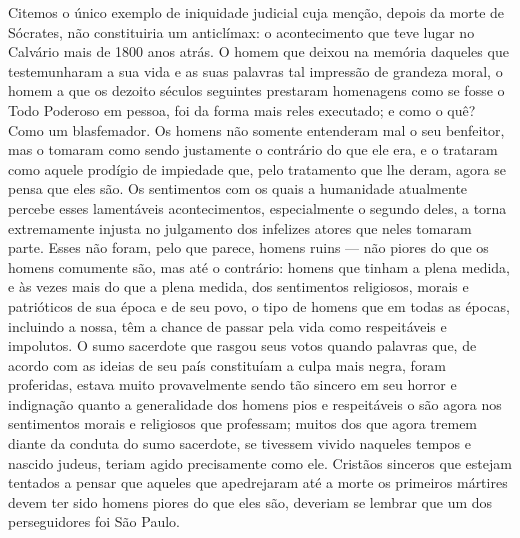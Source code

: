 Citemos o único exemplo de iniquidade judicial cuja menção, depois
da morte de Sócrates, não constituiria um anticlímax: o acontecimento que teve
lugar no Calvário mais de 1800 anos atrás. O homem que
deixou na memória daqueles que testemunharam a sua vida e as suas palavras
tal impressão de grandeza moral, o homem a  que os dezoito séculos 
seguintes prestaram homenagens como se fosse o Todo Poderoso em
pessoa, foi da forma mais reles executado; e como o quê? Como um
blasfemador. Os homens não somente entenderam mal o seu benfeitor, mas
o tomaram como sendo justamente o contrário do que ele era, e o
trataram como aquele prodígio de impiedade que, pelo tratamento que
lhe deram, agora se pensa que eles são. Os sentimentos com os quais a
humanidade atualmente percebe esses lamentáveis acontecimentos,
especialmente o segundo deles, a torna extremamente injusta no
julgamento dos infelizes atores que neles tomaram parte. Esses não
foram, pelo que parece, homens ruins --- não piores do que os homens
comumente são, mas até o contrário: homens que tinham a plena medida, e
às vezes mais do que a plena medida, dos sentimentos religiosos, morais
e patrióticos de sua época e de seu povo, o tipo de homens que em todas
as épocas, incluindo a nossa, têm a chance de passar pela vida
como respeitáveis e impolutos. O sumo sacerdote que rasgou seus votos quando
palavras que, de acordo com as ideias de seu país constituíam a culpa
mais negra, foram proferidas, estava muito provavelmente sendo tão
sincero em seu horror e indignação quanto a generalidade dos homens
pios e respeitáveis o são agora nos sentimentos morais e religiosos que
professam; muitos dos que agora tremem diante da conduta do sumo
sacerdote, se tivessem vivido naqueles tempos e nascido judeus, teriam
agido precisamente como ele. Cristãos sinceros que estejam tentados a
pensar que aqueles que apedrejaram até a morte os primeiros mártires
devem ter sido homens piores do que eles são, deveriam se lembrar que
um dos perseguidores foi São Paulo. 

